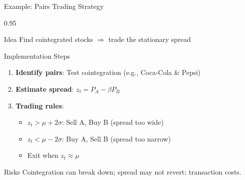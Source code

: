 \documentclass[9pt, aspectratio=169, t]{beamer}
\begin{document}
\begin{frame}{Example: Pairs Trading Strategy}
    \begin{cminipage}{0.95\textwidth}
    \vspace{-0.3cm}
    {\small
    \begin{block}{Idea}
        Find cointegrated stocks $\Rightarrow$ trade the stationary spread
    \end{block}
    \begin{exampleblock}{Implementation Steps}
        \begin{enumerate}\setlength{\itemsep}{0pt}
            \item \textbf{Identify pairs}: Test cointegration (e.g., Coca-Cola \& Pepsi)
            \item \textbf{Estimate spread}: $z_t = P_A - \beta P_B$
            \item \textbf{Trading rules}:
            \begin{itemize}\setlength{\itemsep}{0pt}
                \item $z_t > \mu + 2\sigma$: Sell A, Buy B (spread too wide)
                \item $z_t < \mu - 2\sigma$: Buy A, Sell B (spread too narrow)
                \item Exit when $z_t \approx \mu$
            \end{itemize}
        \end{enumerate}
    \end{exampleblock}
    \begin{alertblock}{Risks}
        Cointegration can break down; spread may not revert; transaction costs.
    \end{alertblock}
    }
    \end{cminipage}
\end{frame}
\end{document}

